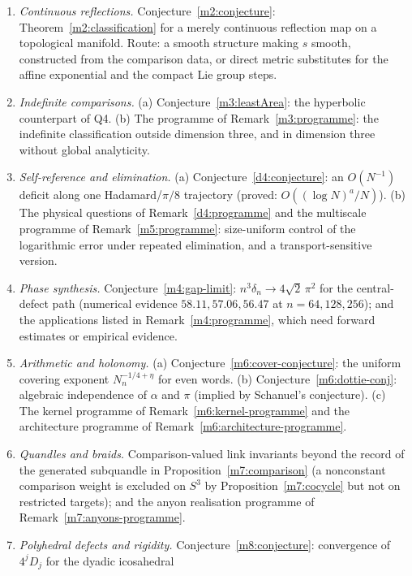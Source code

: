 \documentclass[11pt,reqno]{amsart}
\theoremstyle{definition}
\theoremstyle{remark}
\numberwithin{equation}{section}
\begin{document}
\begin{enumerate}[label=\textbf{Q\arabic*.},leftmargin=2.6em]
is $1$ for three vertices, at most $n-3$ for $n\ge4$ vertices, and $(n-2)/n$ for the real line (Proposition~\ref{m1:sharp}); what is it in
general?  (b) The continuum programme of Remark~\ref{m1:continuum-programme}: refinement, compactness modulo gauge, and identification of
normalised face holonomies with curvature.
\item \emph{Continuous reflections.}  Conjecture~\ref{m2:conjecture}: Theorem~\ref{m2:classification} for a merely continuous reflection
map on a topological manifold.  Route: a smooth structure making $s$ smooth, constructed from the comparison data, or direct metric
substitutes for the affine exponential and the compact Lie group steps.
\item \emph{Indefinite comparisons.}  (a) Conjecture~\ref{m3:leastArea}: the hyperbolic counterpart of Q4.  (b) The programme of
Remark~\ref{m3:programme}: the indefinite classification outside dimension three, and in dimension three without global analyticity.
\item \emph{Self-reference and elimination.}  (a) Conjecture~\ref{d4:conjecture}: an $O(N^{-1})$ deficit along one Hadamard/$\pi/8$
trajectory (proved: $O((\log N)^a/N)$).  (b) The physical questions of Remark~\ref{d4:programme} and the multiscale programme of
Remark~\ref{m5:programme}: size-uniform control of the logarithmic error under repeated elimination, and a transport-sensitive version.
\item \emph{Phase synthesis.}  Conjecture~\ref{m4:gap-limit}: $n^3\delta_n\to4\sqrt2\,\pi^2$ for the central-defect path (numerical evidence
$58.11,57.06,56.47$ at $n=64,128,256$); and the applications listed in Remark~\ref{m4:programme}, which need forward estimates or
empirical evidence.
\item \emph{Arithmetic and holonomy.}  (a) Conjecture~\ref{m6:cover-conjecture}: the uniform covering exponent $N_n^{-1/4+\eta}$ for
even words.  (b) Conjecture~\ref{m6:dottie-conj}: algebraic independence of $\alpha$ and $\pi$ (implied by Schanuel's conjecture).
(c) The kernel programme of Remark~\ref{m6:kernel-programme} and the architecture programme of Remark~\ref{m6:architecture-programme}.
\item \emph{Quandles and braids.}  Comparison-valued link invariants beyond the record of the generated subquandle in
Proposition~\ref{m7:comparison} (a nonconstant comparison weight is excluded on $S^3$ by Proposition~\ref{m7:cocycle} but not on restricted
targets); and the anyon realisation programme of Remark~\ref{m7:anyons-programme}.
\item \emph{Polyhedral defects and rigidity.}  Conjecture~\ref{m8:conjecture}: convergence of $4^jD_j$ for the dyadic icosahedral

\end{enumerate}
\end{document}
